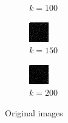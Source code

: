 \documentclass[a4paper, landscape]{article}
\begin{document}
\begin{figure}[H]
\begin{subfigure}{0.12\linewidth}
        \caption{$k = 100$}
    \end{subfigure}
    \begin{subfigure}{0.12\linewidth}
        \centering
        \includegraphics[width=\linewidth]{k = 150.png}
        \caption{$k = 150$}
    \end{subfigure}
    \begin{subfigure}{0.12\linewidth}
        \centering
        \includegraphics[width=\linewidth]{k = 200.png}
        \caption{$k = 200$}
    \end{subfigure}
    \caption{Original images}
    \label{fig:o}
\end{figure}
\end{document}
